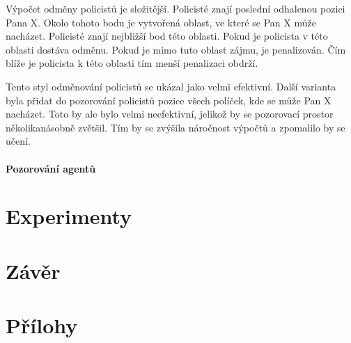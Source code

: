 Výpočet odměny policistů je složitější.
Policisté znají poslední odhalenou pozici Pana X\@.
Okolo tohoto bodu je vytvořená oblast, ve které se Pan X může nacházet.
Policisté znají nejbližší bod této oblasti.
Pokud je policista v této oblasti dostáva odměnu.
Pokud je mimo tuto oblast zájmu, je penalizován.
Čím blíže je policista k této oblasti tím menší penalizaci obdrží.

Tento styl odměnování policistů se ukázal jako velmi efektivní.
Další varianta byla přidat do pozorování policistů pozice všech políček, kde se může Pan X nacházet.
Toto by ale bylo velmi neefektivní, jelikož by se pozorovací prostor několikanásobně zvětšil.
Tím by se zvýšila náročnost výpočtů a zpomalilo by se učení.

\subsubsection*{Pozorování agentů}

\chapter{Experimenty}
\label{ch:experimenty}
\chapter{Závěr}
\label{ch:zaver}
\chapter{Přílohy}
\label{ch:prilohy}




%
